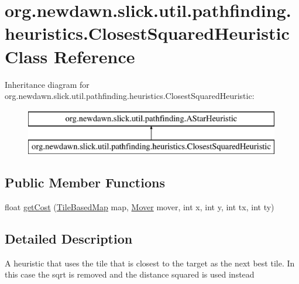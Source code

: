 \hypertarget{classorg_1_1newdawn_1_1slick_1_1util_1_1pathfinding_1_1heuristics_1_1_closest_squared_heuristic}{}\section{org.\+newdawn.\+slick.\+util.\+pathfinding.\+heuristics.\+Closest\+Squared\+Heuristic Class Reference}
\label{classorg_1_1newdawn_1_1slick_1_1util_1_1pathfinding_1_1heuristics_1_1_closest_squared_heuristic}
Inheritance diagram for org.\+newdawn.\+slick.\+util.\+pathfinding.\+heuristics.\+Closest\+Squared\+Heuristic\+:\begin{figure}[H]
\begin{center}
\leavevmode
\includegraphics[height=2.000000cm]{classorg_1_1newdawn_1_1slick_1_1util_1_1pathfinding_1_1heuristics_1_1_closest_squared_heuristic}
\end{center}
\end{figure}
\subsection*{Public Member Functions}
\begin{DoxyCompactItemize}
\item 
float \mbox{\hyperlink{classorg_1_1newdawn_1_1slick_1_1util_1_1pathfinding_1_1heuristics_1_1_closest_squared_heuristic_a7e4d56d25f27fa036b806a2ef3035150}{get\+Cost}} (\mbox{\hyperlink{interfaceorg_1_1newdawn_1_1slick_1_1util_1_1pathfinding_1_1_tile_based_map}{Tile\+Based\+Map}} map, \mbox{\hyperlink{interfaceorg_1_1newdawn_1_1slick_1_1util_1_1pathfinding_1_1_mover}{Mover}} mover, int x, int y, int tx, int ty)
\end{DoxyCompactItemize}


\subsection{Detailed Description}
A heuristic that uses the tile that is closest to the target as the next best tile. In this case the sqrt is removed and the distance squared is used instead

